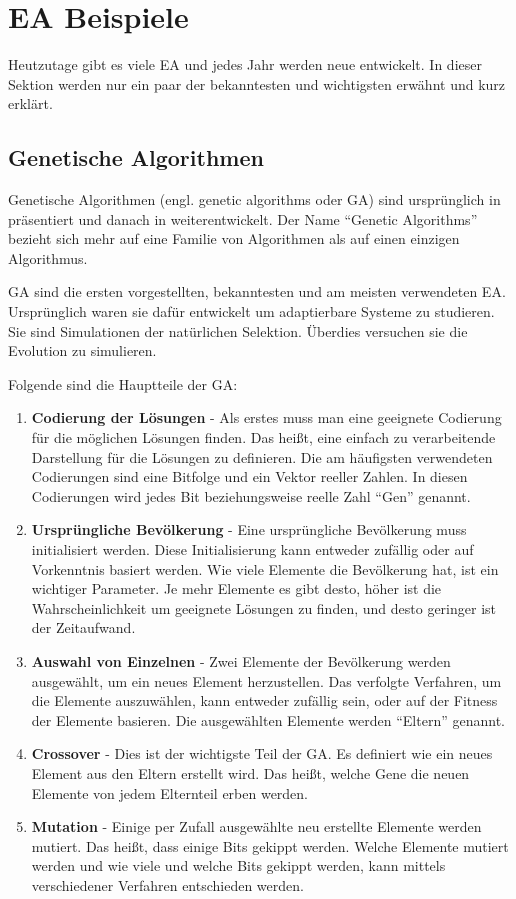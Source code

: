 \documentclass[twoside,twocolumn]{article}
\begin{document}

\section{EA Beispiele}
Heutzutage gibt es viele EA und jedes Jahr werden neue entwickelt. In dieser Sektion werden nur ein paar der bekanntesten und wichtigsten erwähnt und kurz erklärt.

\subsection{Genetische Algorithmen}
Genetische Algorithmen (engl. genetic algorithms oder GA) sind ursprünglich in \cite{holland_ga} präsentiert und danach in \cite{goldberg_ga} weiterentwickelt. Der Name \enquote{Genetic Algorithms} bezieht sich mehr auf eine Familie von Algorithmen als auf einen einzigen Algorithmus.\par
GA sind die ersten vorgestellten, bekanntesten und am meisten verwendeten EA. Ursprünglich waren sie dafür entwickelt um adaptierbare Systeme zu studieren. Sie sind Simulationen der natürlichen Selektion. Überdies versuchen sie die Evolution zu simulieren.\par
Folgende sind die Hauptteile der GA:

\begin{enumerate}
\item{\textbf{Codierung der Lösungen} - Als erstes muss man eine geeignete Codierung für die möglichen Lösungen finden. Das heißt, eine einfach zu verarbeitende Darstellung für die Lösungen zu definieren. Die am häufigsten verwendeten Codierungen sind eine Bitfolge und ein Vektor reeller Zahlen. In diesen Codierungen wird jedes Bit beziehungsweise reelle Zahl \enquote{Gen} genannt.}
\item{\textbf{Ursprüngliche Bevölkerung} - Eine ursprüngliche Bevölkerung muss initialisiert werden. Diese Initialisierung kann entweder zufällig oder auf Vorkenntnis basiert werden. Wie viele Elemente die Bevölkerung hat, ist ein wichtiger Parameter. Je mehr Elemente es gibt desto, höher ist die Wahrscheinlichkeit um geeignete Lösungen zu finden, und desto geringer ist der Zeitaufwand.}
\item{\textbf{Auswahl von Einzelnen} - Zwei Elemente der Bevölkerung werden ausgewählt, um ein neues Element herzustellen. Das verfolgte Verfahren, um die Elemente auszuwählen, kann entweder zufällig sein, oder auf der Fitness der Elemente basieren. Die ausgewählten Elemente werden \enquote{Eltern} genannt.}
\item{\textbf{Crossover} - Dies ist der wichtigste Teil der GA. Es definiert wie ein neues Element aus den Eltern erstellt wird. Das heißt, welche Gene die neuen Elemente von jedem Elternteil erben werden.}
\item{\textbf{Mutation} - Einige per Zufall ausgewählte neu erstellte Elemente werden mutiert. Das heißt, dass einige Bits gekippt werden. Welche Elemente mutiert werden und wie viele und welche Bits gekippt werden, kann mittels verschiedener Verfahren entschieden werden.}
\end{enumerate}
\end{document}
